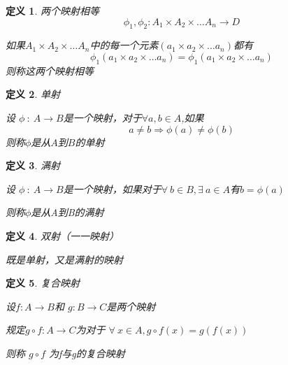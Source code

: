 \documentclass[a4paper]{ctexart}
\newtheorem{definition}{定义}[subsection]
\begin{document}
	\begin{definition}
		两个映射相等
		\[\phi_1,\phi_2{:}A_1\times A_2\times \dots A_n \to D\]
		
		如果$A_1\times A_2\times \dots A_n$中的每一个元素$(a_1\times a_2\times \dots a_n)$都有\[\phi_1(a_1\times a_2\times \dots a_n)=\phi_1(a_1\times a_2\times \dots a_n)\]
		则称这两个映射相等
	\end{definition}

	\begin{definition}单射
		
	设 $ \phi{\ :\  }  A \to B$是一个映射，对于$\forall a,b\in A$,如果 \[a\neq b \Rightarrow \phi(a)\neq \phi(b)\]则称$\phi$是从$ A $到$ B $的单射
	\end{definition}
	
	\begin{definition}
		满射
		
		设 $ \phi{\ :\  }  A \to B$是一个映射，如果对于$\forall \ b\in B,\exists \  a\in A$有$b=\phi(a)$
		
		则称$\phi$是从A到B的满射
	\end{definition}

	\begin{definition}
		双射（一一映射）
		
		既是单射，又是满射的映射 
	\end{definition}

	\begin{definition}
		复合映射
		
		设$ f:A\to B $和 $ g:B \to C $是两个映射
		
		规定$ g\circ f:A\to C $为对于 $\forall \ x \in A ,g\circ f(x) =g(f(x))$
		
		则称 $ g\circ f $ 为f与g的复合映射
	\end{definition}
\end{document}
